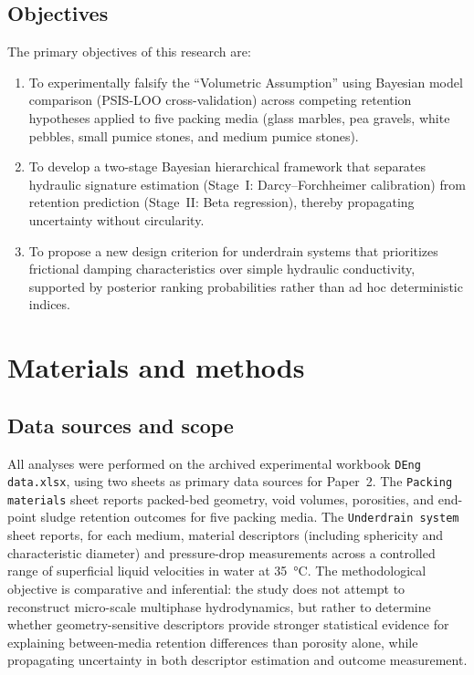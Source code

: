 \documentclass[12pt,a4paper]{article}
\begin{document}
\subsection{Objectives}
The primary objectives of this research are:
\begin{enumerate}
    \item To experimentally falsify the ``Volumetric Assumption'' using Bayesian model comparison (PSIS-LOO cross-validation) across competing retention hypotheses applied to five packing media (glass marbles, pea gravels, white pebbles, small pumice stones, and medium pumice stones).
    \item To develop a two-stage Bayesian hierarchical framework that separates hydraulic signature estimation (Stage~I: Darcy--Forchheimer calibration) from retention prediction (Stage~II: Beta regression), thereby propagating uncertainty without circularity.
    \item To propose a new design criterion for underdrain systems that prioritizes frictional damping characteristics over simple hydraulic conductivity, supported by posterior ranking probabilities rather than ad hoc deterministic indices.
\end{enumerate}

\section{Materials and methods}

\subsection{Data sources and scope}
All analyses were performed on the archived experimental workbook \texttt{DEng data.xlsx}, using two sheets as primary data sources for Paper~2. The \texttt{Packing materials} sheet reports packed-bed geometry, void volumes, porosities, and end-point sludge retention outcomes for five packing media. The \texttt{Underdrain system} sheet reports, for each medium, material descriptors (including sphericity and characteristic diameter) and pressure-drop measurements across a controlled range of superficial liquid velocities in water at \SI{35}{\celsius}. The methodological objective is comparative and inferential: the study does not attempt to reconstruct micro-scale multiphase hydrodynamics, but rather to determine whether geometry-sensitive descriptors provide stronger statistical evidence for explaining between-media retention differences than porosity alone, while propagating uncertainty in both descriptor estimation and outcome measurement.
\end{document}
